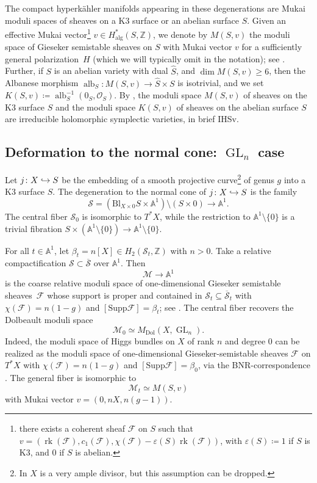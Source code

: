 \documentclass[JEP,XML,SOM,Unicode, NoEqCountersInSection,NoFloatCountersInSection,published]{cedram}
\let\mathcal\mathscr
\let\epsilon\varepsilon
\newcommand\hto{\mathrel{\lhook\joinrel\to}}
\DeclareMathOperator{\rk}{rk}
\theoremstyle{definition}
\newcommand{\Aff}{\mathbb{A}}
\newcommand{\ZZ}{\mathbb{Z}}
\newcommand{\alb}{\operatorname{alb}}
\newcommand{\Gl}{\operatorname{GL}}
\newcommand{\MDolGl}{{M}_{\mathrm{Dol}}(X, \Gl_n)}
\newcommand{\Mukai}{M(S, v)}
\newcommand{\Kumm}{K(S, v)}
\begin{document}
The compact hyperkähler manifolds appearing in these degenerations are Mukai moduli spaces of sheaves on a K3 surface or an abelian surface $S$. Given an effective Mukai vector\footnote{\ie there exists a coherent sheaf $\mathcal{F}$ on $S$ such that $v = (\rk(\mathcal{F}), c_1(\mathcal{F}), \chi(\mathcal{F})-\epsilon(S)\rk(\mathcal{F}))$, with $\epsilon(S)\coloneqq 1$ if $S$ is K3, and $0$ if $S$ is abelian.} $v \in H^{*}_{\mathrm{alg}}(S, \ZZ)$, we denote by $\Mukai$ the moduli space of Gieseker semistable sheaves on $S$ with Mukai vector $v$
for a sufficiently general polariza\-tion~$H$ (which we will typically omit in the notation); see \cite[\S 1]{Simpson1994I}. Further, if $S$ is an abelian variety with dual $\hat{S}$, and $\dim \Mukai\geq 6$,
then the Albanese morphism
$\alb_S\colon \Mukai \to \hat{S} \times S$
is isotrivial, and we set
$\Kumm \coloneqq \alb_S^{-1}(0_S, \mathcal{O}_S)$. By \cite{PeregoRapagnetta18}, the moduli space $\Mukai$ of sheaves on the K3 surface $S$ and the moduli space $\Kumm$ of sheaves on the abelian surface $S$ are irreducible holomorphic symplectic varieties, in brief IHSv.

\subsection{Deformation to the normal cone: $\Gl_n$ case}
Let $j \colon X \hto S$ be the embedding of a smooth projective curve\footnote{In \cite{DEL97} $X$ is a very ample divisor, but this assumption can be dropped.} of genus $g$ into a K3 surface $S$. The degeneration to the normal cone of $j \colon X \hto S$ is the family
\[
\mathcal{S}=\left(\mathrm{Bl}_{X\times 0}S\times \Aff^1\right)\setminus \left( S\times 0\right)\to \Aff^1.
\]
The central fiber $\mathcal{S}_0$ is isomorphic to $T^*X$, while the restriction to $\Aff^1 \setminus \{0\}$ is a trivial fibration
$S\times (\Aff^1 \setminus \{0\})\to \Aff^1 \setminus \{0\}$.

For all $t\in \Aff^1$, let $\beta_t=n[X]\in H_2(\mathcal{S}_t,\ZZ)$ with $n>0$. Take a relative compactification $\mathcal{S} \subset \overline{\mathcal{S}}$ over $\Aff^1$. Then
\[
\mathcal{M} \to \Aff^1
\]
is the coarse relative moduli space of one-dimensional Gieseker semistable sheaves~$\mathcal{F}$ whose support is proper and contained in $\mathcal{S}_t \subseteq \overline{\mathcal{S}}_t$ with $\chi(\mathcal{F})=n(1-g)$ and $[\mathrm{Supp}\mathcal{F}]=\beta_t$; see \cite[Th.\,1.21]{Simpson1994I}. The central fiber recovers the Dolbeault moduli space
\[
\mathcal{M}_0 \simeq \MDolGl.
\]
Indeed, the moduli space of Higgs bundles on $X$ of rank $n$ and degree $0$ can be realized as the moduli space of one-dimensional Gieseker-semistable sheaves $\mathcal{F}$ on $T^*X$ with $\chi(\mathcal{F})=n(1-g)$ and $[\mathrm{Supp}\mathcal{F}]=\beta_0$, via the BNR-correspondence \cite{BNR89}. The general fiber is isomorphic to
\[
\mathcal{M}_t \simeq M(S,v)
\]
with Mukai vector $v=(0,nX, n(g-1))$.
\end{document}
